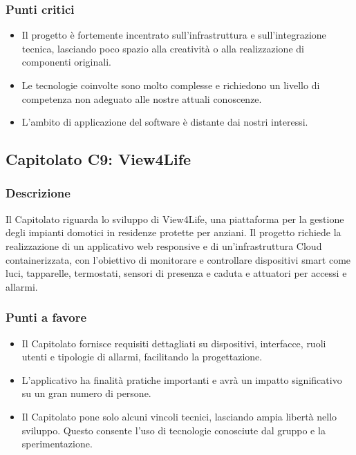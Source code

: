 \documentclass[a4paper,12pt]{article}
\begin{document}
\subsubsection{Punti critici}
\begin{itemize}
    \item Il progetto è fortemente incentrato sull’infrastruttura e sull’integrazione tecnica, lasciando poco spazio alla creatività o alla realizzazione di componenti originali.
    \item Le tecnologie coinvolte sono molto complesse e richiedono un livello di competenza non adeguato alle nostre attuali conoscenze.
    \item L’ambito di applicazione del software è distante dai nostri interessi.
\end{itemize}





\subsection{Capitolato C9: View4Life}

\subsubsection{Descrizione}
Il Capitolato riguarda lo sviluppo di View4Life, una piattaforma per la gestione degli impianti domotici in residenze protette per anziani. Il progetto richiede la realizzazione di un applicativo web responsive e di un’infrastruttura Cloud containerizzata, con l’obiettivo di monitorare e controllare dispositivi smart come luci, tapparelle, termostati, sensori di presenza e caduta e attuatori per accessi e allarmi.

\subsubsection{Punti a favore}
\begin{itemize}
    \item Il Capitolato fornisce requisiti dettagliati su dispositivi, interfacce, ruoli utenti e tipologie di allarmi, facilitando la progettazione.
    \item L’applicativo ha finalità pratiche importanti e avrà un impatto significativo su un gran numero di persone.
    \item Il Capitolato pone solo alcuni vincoli tecnici, lasciando ampia libertà nello sviluppo. Questo consente l’uso di tecnologie conosciute dal gruppo e la sperimentazione.
\end{itemize}
\end{document}

